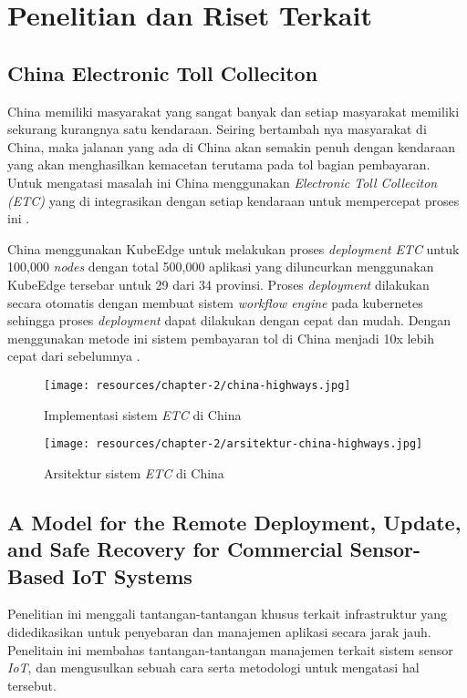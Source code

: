 \section{Penelitian dan Riset Terkait}
\label{sec:riset-terkait}

\subsection{China Electronic Toll Colleciton}
China memiliki masyarakat yang sangat banyak dan setiap masyarakat memiliki sekurang kurangnya satu kendaraan. Seiring bertambah nya masyarakat di China, maka jalanan yang ada di China akan semakin penuh dengan kendaraan yang akan menghasilkan kemacetan terutama pada tol bagian pembayaran. Untuk mengatasi masalah ini China menggunakan \textit{Electronic Toll Colleciton (ETC)} yang di integrasikan dengan setiap kendaraan untuk mempercepat proses ini \parencite{penelitianterkait1}.

China menggunakan KubeEdge untuk melakukan proses \textit{deployment} \textit{ETC} untuk 100,000 \textit{nodes} dengan total 500,000 aplikasi yang diluncurkan menggunakan KubeEdge tersebar untuk 29 dari 34 provinsi. Proses \textit{deployment} dilakukan secara otomatis dengan membuat sistem \textit{workflow engine} pada kubernetes sehingga proses \textit{deployment} dapat dilakukan dengan cepat dan mudah. Dengan menggunakan metode ini sistem pembayaran tol di China menjadi 10x lebih cepat dari sebelumnya \parencite{penelitianterkait1}.

\begin{figure}[h]
  \centering
  \texttt{[image: resources/chapter-2/china-highways.jpg]}
  \caption{Implementasi sistem \textit{ETC} di China \parencite{penelitianterkait1}}
  \label{fig:china-highways}
\end{figure}

\begin{figure}[h]
  \texttt{[image: resources/chapter-2/arsitektur-china-highways.jpg]}
  \caption{Arsitektur sistem \textit{ETC} di China \parencite{penelitianterkait1}}
  \label{fig:architecture-china-highways}
\end{figure}

\subsection{A Model for the Remote Deployment, Update, and Safe Recovery for Commercial Sensor-Based IoT Systems}
Penelitian ini menggali tantangan-tantangan khusus terkait infrastruktur yang didedikasikan untuk penyebaran dan manajemen aplikasi secara jarak jauh. Penelitain ini membahas tantangan-tantangan manajemen terkait sistem sensor \textit{IoT}, dan mengusulkan sebuah cara serta metodologi untuk mengatasi hal tersebut.

